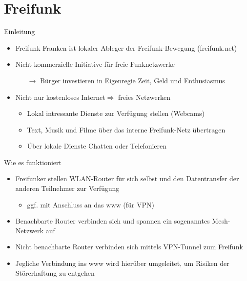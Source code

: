 \section{Freifunk}

\begin{frame}{Einleitung}
    \begin{itemize}
        \item Freifunk Franken ist lokaler Ableger der Freifunk-Bewegung (freifunk.net)
        \item Nicht-kommerzielle Initiative für freie Funknetzwerke\\
        \begin{itemize}
            \item[$\rightarrow$] Bürger investieren in Eigenregie Zeit, Geld und Enthusiasmus
        \end{itemize}
        \item Nicht nur \glqq{}kostenloses Internet\grqq $\Rightarrow$ \glqq{}freies Netzwerken\grqq\\
        \begin{itemize}
            \item Lokal intressante Dienste zur Verfügung stellen (Webcams)
            \item Text, Musik und Filme über das interne Freifunk-Netz übertragen
            \item Über lokale Dienste Chatten oder Telefonieren
        \end{itemize}
    \end{itemize}
\end{frame}

\begin{frame}{Wie es funktioniert}
    \begin{itemize}
        \item Freifunker stellen WLAN-Router für sich selbst und den Datentransfer der anderen Teilnehmer zur Verfügung
        \begin{itemize}
            \item ggf. mit Anschluss an das www (für VPN)
        \end{itemize}
        \item Benachbarte Router verbinden sich und spannen ein sogenanntes Mesh-Netzwerk auf
        \item Nicht benachbarte Router verbinden sich mittels VPN-Tunnel zum Freifunk
        \item Jegliche Verbindung ins www wird hierüber umgeleitet, um Risiken der Störerhaftung zu entgehen
    \end{itemize}
\end{frame}

